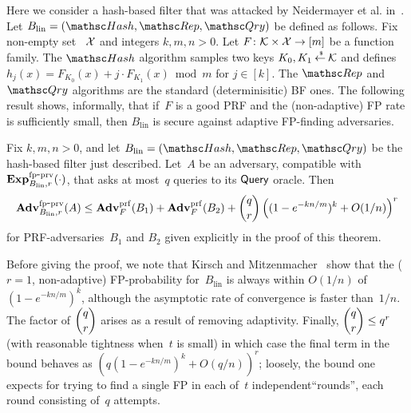 Here we consider a hash-based filter that was attacked by Neidermayer et al. in~\cite{xxx}.  Let $B_{\mathrm{lin}}=(\Hash,\Rep,\Qry)$ be defined as follows.  Fix non-empty set ~${\cal X}$ and integers $k,m,n>0$.  Let $F\colon\mathcal{K} \times {\cal X} \to [m]$ be a function family.  The $\Hash$ algorithm samples two keys $K_0,K_1 {\:\stackrel{{\scriptscriptstyle \hspace{0.2em}\$}} {\leftarrow}\:} \mathcal{K}$ and defines $h_j(x) = F_{K_0}(x) + j\cdot F_{K_1}(x) \bmod m$ for $j \in [k]$.  The $\Rep$ and $\Qry$ algorithms are the standard (determinisitic) BF ones. The following result shows, informally, that if~$F$ is a good PRF and the (non-adaptive) FP rate is sufficiently small, then $B_\mathrm{lin}$ is secure against adaptive FP-finding adversaries.

\begin{theorem}\label{thm1}
Fix $k,m,n>0$, and let $B_\mathrm{lin}=(\Hash,\Rep,\Qry)$ be the hash-based filter just described. 
Let~$A$ be an adversary, compatible with $\mathrm{\mathbf{Exp}}^{\mathrm{fp\mbox{-}prv}}_{B_\mathrm{lin},r}(\cdot)$, that asks at most~$q$ queries to its $\mathsf{Query}$ oracle.  Then 
\[
\mathrm{\mathbf{Adv}}^{\mathrm{fp\mbox{-}prv}}_{B_{\mathrm{lin}},r}(A) \leq  \mathbf{Adv}^{\mathrm{prf}}_{F}(B_1) +
\mathbf{Adv}^{\mathrm{prf}}_{F}(B_2)  +{\dbinom{q}{r}} \left( (1-e^{-kn/m})^k + O(1/n) \right)^r
\]
for PRF-adversaries~$B_1$ and $B_2$ given explicitly in the proof of
this theorem.  
\end{theorem}
Before giving the proof, we note that Kirsch and Mitzenmacher~\cite{xxx} show
that the ($r=1$, non-adaptive) FP-probability for~$B_\mathrm{lin}$ is
always within $O(1/n)$ of $(1-e^{-kn/m})^k$, although the asymptotic
rate of convergence is faster than~$1/n$.  The factor of $\dbinom{q}{r}$ arises as a result
of removing adaptivity.  Finally, $\dbinom{q}{r} \leq q^r$ (with
reasonable tightness when~$t$ is small) in which case the final term in the bound behaves as 
$(q (1-e^{-kn/m})^k + O(q/n) )^r$; loosely, the bound one expects for
trying to find a single FP in each of~$t$ independent``rounds'', each round
consisting of~$q$ attempts.
%
